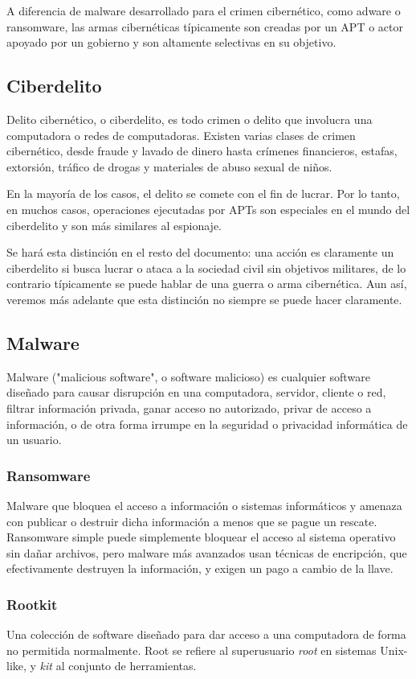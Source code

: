 \documentclass{article}
\begin{document}
A diferencia de malware desarrollado para el crimen cibernético, como adware o ransomware, las armas cibernéticas típicamente son creadas por un APT o actor apoyado por un gobierno y son altamente selectivas en su objetivo.

\subsection{Ciberdelito}
Delito cibernético, o ciberdelito, es todo crimen o delito que involucra una computadora o redes de computadoras. Existen varias clases de crimen cibernético, desde fraude y lavado de dinero hasta crímenes financieros, estafas, extorsión, tráfico de drogas y materiales de abuso sexual de niños.

En la mayoría de los casos, el delito se comete con el fin de lucrar. Por lo tanto, en muchos casos, operaciones ejecutadas por APTs son especiales en el mundo del ciberdelito y son más similares al espionaje.

Se hará esta distinción en el resto del documento: una acción es claramente un ciberdelito si busca lucrar o ataca a la sociedad civil sin objetivos militares, de lo contrario típicamente se puede hablar de una guerra o arma cibernética. Aun así, veremos más adelante que esta distinción no siempre se puede hacer claramente.

\subsection{Malware}
Malware ("malicious software", o software malicioso) es cualquier software diseñado para causar disrupción en una computadora, servidor, cliente o red, filtrar información privada, ganar acceso no autorizado, privar de acceso a información, o de otra forma irrumpe en la seguridad o privacidad informática de un usuario.

\subsubsection{Ransomware}
Malware que bloquea el acceso a información o sistemas informáticos y amenaza con publicar o destruir dicha información a menos que se pague un rescate. Ransomware simple puede simplemente bloquear el acceso al sistema operativo sin dañar archivos, pero malware más avanzados usan técnicas de encripción, que efectivamente destruyen la información, y exigen un pago a cambio de la llave.

\subsubsection{Rootkit}
Una colección de software diseñado para dar acceso a una computadora de forma no permitida normalmente. Root se refiere al superusuario {\it root} en sistemas Unix-like, y {\it kit} al conjunto de herramientas.
\end{document}
